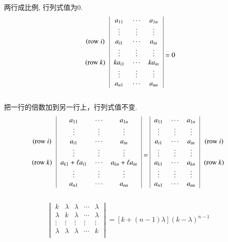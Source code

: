\begin{Property}
两行成比例, 行列式值为$0$.
$$
\begin{blockarray}{c|ccc|}
&a_{11} & \cdots & a_{1n} \\
&\vdots & \vdots & \vdots \\
\text{(row $i$)} &a_{i1} & \cdots & a_{in} \\
&\vdots & \vdots & \vdots \\
\text{(row $k$)} &k a_{i1} & \cdots & k a_{in} \\
&\vdots & \vdots & \vdots \\
&a_{n1} & \cdots & a_{nn} \\
\end{blockarray}
= 
0
$$
\end{Property}


\begin{Property}
把一行的倍数加到另一行上，行列式值不变.
$$
\begin{blockarray}{c|ccc|}
&a_{11} & \cdots & a_{1n} \\
&\vdots & \vdots & \vdots \\
\text{(row $i$)} &a_{i1} & \cdots & a_{in} \\
&\vdots & \vdots & \vdots \\
\text{(row $k$)} & a_{k1} +\ell a_{i1} & \cdots & a_{kn} +\ell a_{in} \\
&\vdots & \vdots & \vdots \\
&a_{n1} & \cdots & a_{nn} \\
\end{blockarray}
= 
\begin{blockarray}{|ccc|c}
a_{11} & \cdots & a_{1n} &\\
\vdots & \vdots & \vdots &\\
a_{i1} & \cdots & a_{in} & \text{(row $i$)}\\
\vdots & \vdots & \vdots &\\
a_{k1} & \cdots & a_{kn} & \text{(row $k$)}\\
\vdots & \vdots & \vdots &\\
a_{n1} & \cdots & a_{nn} &\\
\end{blockarray}
$$
\end{Property}

\begin{Proposition}
$$
\begin{vmatrix}
k       & \lambda & \lambda & \cdots & \lambda \\
\lambda & k       & \lambda & \cdots & \lambda \\
\vdots  & \vdots  & \vdots  & \vdots & \vdots  \\
\lambda & \lambda & \lambda & \cdots & k       \\
\end{vmatrix} = \left[ k + (n-1) \lambda \right] \left( k - \lambda \right)^{n-1}
$$
\end{Proposition}

